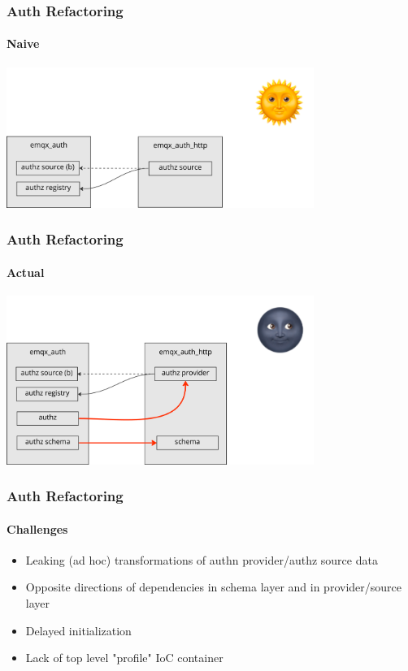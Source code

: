 \documentclass{beamer}
\begin{document}
\begin{frame}
    \frametitle{Auth Refactoring}
    \framesubtitle{Naive}

    \begin{center}
        \includegraphics[width=10cm, keepaspectratio]{images/refactor-naive.png}
    \end{center}
\end{frame}


\begin{frame}
    \frametitle{Auth Refactoring}
    \framesubtitle{Actual}

    \begin{center}
        \includegraphics[width=10cm, keepaspectratio]{images/refactor-real.png}
    \end{center}
\end{frame}


\begin{frame}
    \frametitle{Auth Refactoring}
    \framesubtitle{Challenges}

    \begin{center}
        \begin{itemize}
            \item Leaking (ad hoc) transformations of authn provider/authz source data
            \item Opposite directions of dependencies in schema layer and in provider/source layer
            \item Delayed initialization
            \item Lack of top level "profile" IoC container
        \end{itemize}
    \end{center}
\end{frame}
\end{document}
